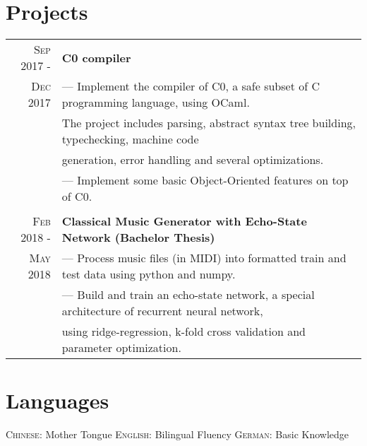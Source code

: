 \documentclass[a4paper,10pt]{article}
\begin{document}
	\section{Projects}
	\begin{tabular}{r | l}
	    \textsc{Sep 2017 - } & \textbf{C0 compiler} 
	    \\\textsc{Dec 2017}& --- Implement the compiler of C0, a safe subset of C programming language, using OCaml.\\&The project includes parsing, abstract syntax tree building, typechecking, machine code\\& generation, error handling and several optimizations.
	    \\& --- Implement some basic Object-Oriented features on top of C0.
		\\ \multicolumn{1}{c}{} \\
	    \textsc{Feb 2018 - } & \textbf{Classical Music Generator with Echo-State Network (Bachelor Thesis)} \\\textsc{May 2018}& --- Process music files (in MIDI) into formatted train and test data using python and numpy.
	    \\& --- Build and train an echo-state network, a special architecture of recurrent neural network,\\&using ridge-regression, k-fold cross validation and parameter optimization. 

	\end{tabular}
	
	\section{Languages}
		\textsc{Chinese:} Mother Tongue \quad \quad
		\textsc{English:} Bilingual Fluency \quad \quad
		\textsc{German:} Basic Knowledge \quad \quad
	
\end{document}
